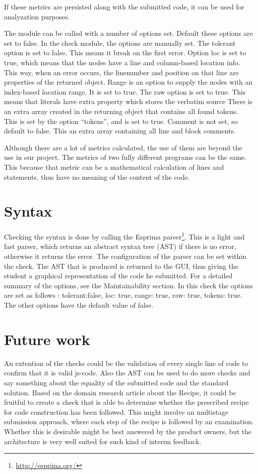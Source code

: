 If these metrics are persisted along with the submitted code, it can be used for
analyzation purposes.

The module can be called with a number of options set.
Default these options are set to false.
In the \gls{check} module, the options are manually set.
The tolerant option is set to false. This means it break on the first error.
Option loc is set to true, which means that the nodes have a line and column-based location info.
This way, when an error occurs, the linenumber and position on that line are properties of the returned object.
Range is an option to supply the nodes with an index-based location range. It is set to true.
The raw option is set to true. This means that literals have extra property which stores the verbatim source
There is an extra array created in the returning object that contains all found tokens.
This is set by the option ``tokens'', and is set to true.
Comment is not set, so default to false.
This an extra array containing all line and block comments.

Although there are a lot of metrics calculated, the use of them are beyond the
use in our project.
The metrics of two fully different programs can be the same.
This because that metric can be a mathematical calculation of lines and statements,
thus have no meaning of the content of the code.


\section{Syntax}

Checking the syntax is done by calling the Esprima 
parser\footnote{\url{http://esprima.org/}}. This is a light and fast parser, 
which returns an abstract syntax tree (AST) if there is no error, otherwise it returns
the error. The configuration of the parser can be set within the check.
The AST that is produced is returned to the GUI, thus giving the \gls{student} a
graphical representation of the code he submitted.
For a detailed summary of the options, see the Maintainability section.
In this \gls{check} the options are set as follows : tolerant:false, loc: true, range: true, raw: true, tokens: true.
The other options have the default value of false.


\section{Future work}
An extention of the \glspl{check} could be the validation of
every single line of code to confirm that it is valid \gls{js-code}.
Also the AST can be used to do more \glspl{check} and say something about the
equality of the submitted code and the standard solution. Based on the domain 
research article about the Recipe, it could be fruitful to create a \gls{check} 
that is able to determine whether the prescribed recipe for code construction 
has been followed. This might involve an multistage submission approach, where 
each step of the recipe is followed by an examination. Whether this is desirable
might be best answered by the product owners, but the architecture is very well
suited for such kind of interim feedback.

